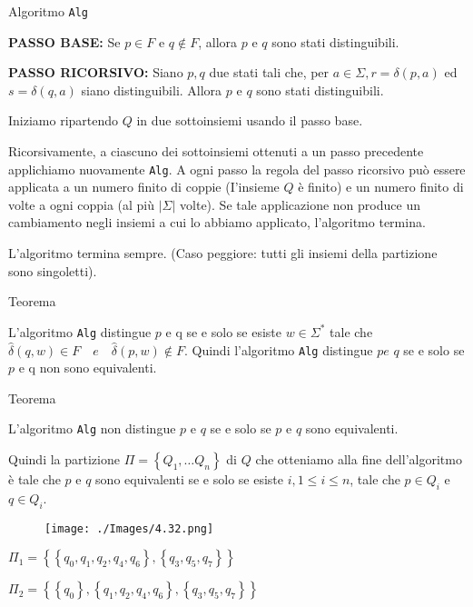 Algoritmo \texttt{Alg}

\textbf{PASSO BASE:} Se $p \in F$ e $q \notin F$, allora $p$ e $q$ sono stati distinguibili.

\textbf{PASSO RICORSIVO:} Siano $p, q$ due stati tali che, per $a \in \Sigma, r=\delta(p, a)$ ed $s=\delta(q, a)$ siano distinguibili. Allora $p$ e $q$ sono stati distinguibili.

Iniziamo ripartendo $Q$ in due sottoinsiemi usando il passo base.

Ricorsivamente, a ciascuno dei sottoinsiemi ottenuti a un passo precedente applichiamo nuovamente \texttt{Alg}. A ogni passo la regola del passo ricorsivo può essere applicata a un numero finito di coppie (I'insieme $Q$ è finito) e un numero finito di volte a ogni coppia (al più $|\Sigma|$ volte).
Se tale applicazione non produce un cambiamento negli insiemi a cui lo abbiamo applicato, l'algoritmo termina.

L'algoritmo termina sempre. (Caso peggiore: tutti gli insiemi della partizione sono singoletti).

\vspace{5mm}

Teorema

L'algoritmo \texttt{Alg} distingue $p$ e q se e solo se esiste $w \in \Sigma^{*}$ tale che $\hat{\delta}(q, w) \in F \quad e \quad  \hat{\delta}(p, w) \notin F$. Quindi l'algoritmo \texttt{Alg} distingue $p e$ $q$ se e solo se $p$ e q non sono equivalenti.

\vspace{5mm}

Teorema

L'algoritmo \texttt{Alg} non distingue $p$ e $q$ se e solo se $p$ e $q$ sono equivalenti.

Quindi la partizione $\Pi=\left\{Q_{1}, \ldots Q_{n}\right\}$ di $Q$ che otteniamo alla fine dell'algoritmo è tale che $p$ e $q$ sono equivalenti se e solo se esiste $i, 1 \leq i \leq n$, tale che $p \in Q_{i}$ e $q \in Q_{i}$.

\begin{figure}[hbpt!]
    \centering
    \texttt{[image: ./Images/4.32.png]}
\end{figure}
\FloatBarrier

$\Pi_{1}=\left\{\left\{q_{0}, q_{1}, q_{2}, q_{4}, q_{6}\right\},\left\{q_{3}, q_{5}, q_{7}\right\}\right\}$

$\Pi_{2}=\left\{\left\{q_{0}\right\},\left\{q_{1}, q_{2}, q_{4}, q_{6}\right\},\left\{q_{3}, q_{5}, q_{7}\right\}\right\}$

